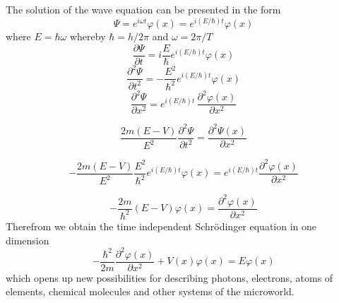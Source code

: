 \documentclass[12pt,a4paper,pl,fleqn]{article}
\begin{document}
The solution of the wave equation can be presented in the form
\begin{equation}
\Psi =  e^{i \omega t}  \varphi(x) =   e^{i (E/\hbar) t} \varphi(x)     
\end{equation}
where $E = \hbar \omega$ whereby $\hbar = h/2\pi$ and $\omega = 2\pi/T$
\begin{equation}
\frac{\partial \Psi}{\partial t} = i \frac{E}{\hbar} e^{i (E/\hbar) t} \varphi(x)
\end{equation}
\begin{equation}
\frac{\partial^{2} \Psi}{\partial t^{2}} = - \frac{E^{2}}{\hbar^{2}} e^{i (E/\hbar) t} \varphi(x)
\end{equation}
\begin{equation}
\frac{\partial^{2} \Psi}{\partial x^{2}} = e^{i (E/\hbar) t} \, \frac{\partial^{2} \varphi(x)}{\partial x^{2}}
\end{equation}


\begin{equation}
\frac{2m(E - V)}{E^{2}} \frac{\partial^{2} \Psi}{\partial t^{2}} = \frac{\partial^{2} \Psi(x)}{\partial x^{2}}
\end{equation}


\begin{equation}
- \frac{2m(E - V)}{E^{2}} \frac{E^{2}}{\hbar^{2}} e^{i (E/\hbar) t} \varphi(x) = e^{i (E/\hbar) t} \frac{\partial^{2} \varphi(x)}{\partial x^{2}}
\end{equation}

\begin{equation}
- \frac{2m}{\hbar^{2}} (E - V) \varphi(x) = \frac{\partial^{2} \varphi(x)}{\partial x^{2}}
\end{equation}
Therefrom we obtain the time independent Schrödinger equation in one dimension
\begin{equation}
- \frac{\hbar^{2}}{2 m} \frac{\partial^{2} \varphi(x)}{\partial x^{2}}  + V(x) \varphi(x) = E \varphi(x)
\end{equation}
which opens up new possibilities for describing photons, electrons, atoms of elements, chemical molecules and other systems of the microworld.
\end{document}
